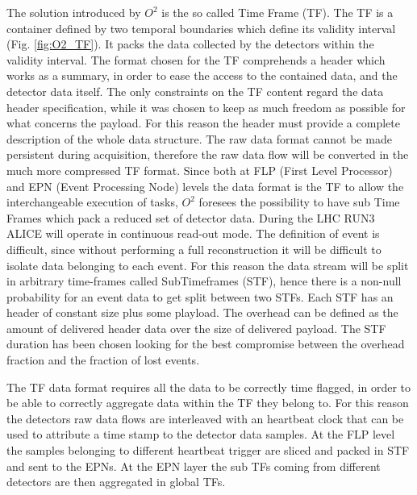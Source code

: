 The solution introduced by $O^2$ is the so called Time Frame (TF).
The TF is a container defined by two temporal boundaries which define its validity interval (Fig. \ref{fig:O2_TF}).
It packs the data collected by the detectors within the validity interval.
The format chosen for the TF comprehends a header which works as a summary, in order to ease the access to the contained data, and the detector data itself.
The only constraints on the TF content regard the data header specification, while it was chosen to keep as much freedom as possible for what concerns the payload.
For this reason the header must provide a complete description of the whole data structure.
The raw data format cannot be made persistent during acquisition, therefore the raw data flow will be converted in the much more compressed TF format.
Since both at FLP (First Level Processor) and EPN (Event Processing Node) levels the data format is the TF to allow the interchangeable execution of tasks, $O^2$ foresees the possibility to have sub Time Frames which pack a reduced set of detector data.
During the LHC RUN3 ALICE will operate in continuous read-out mode.
The definition of event is difficult, since without performing a full reconstruction it will be difficult to isolate data belonging to each event.
For this reason the data stream will be split in arbitrary time-frames called SubTimeframes (STF), hence there is a non-null probability for an event data to get split between two STFs.
Each STF has an header of constant size plus some playload.
The overhead can be defined as the amount of delivered header data over the size of delivered payload.
The STF duration has been chosen looking for the best compromise between the overhead fraction and the fraction of lost events.


The TF data format requires all the data to be correctly time flagged, in order to be able to correctly aggregate data within the TF they belong to.
For this reason the detectors raw data flows are interleaved with an heartbeat clock that can be used to attribute a time stamp to the detector data samples.
At the FLP level the samples belonging to different heartbeat trigger are sliced and packed in STF and sent to the EPNs.
At the EPN layer the sub TFs coming from different detectors are then aggregated in global TFs.


